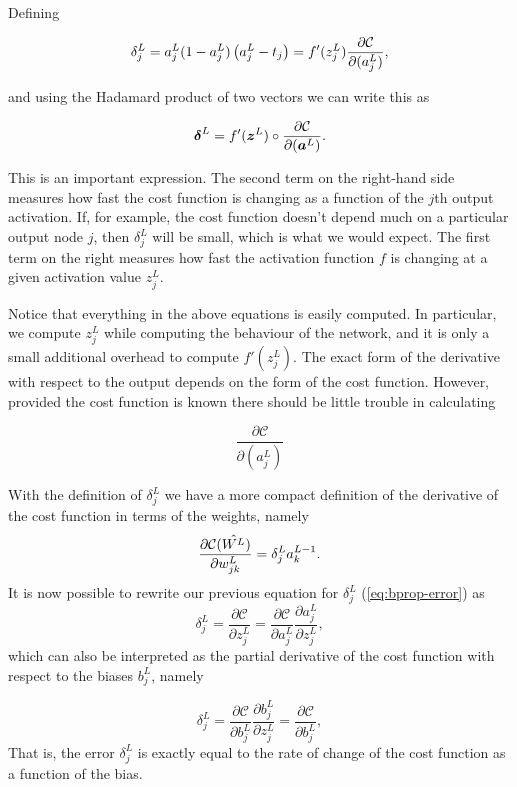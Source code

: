 \noindent Defining

$$\delta_j^L = a_j^L(1-a_j^L)\left(a_j^L - t_j\right) = f'(z_j^L)\frac{\partial {\cal C}}{\partial (a_j^L)},$$

and using the Hadamard product of two vectors we can write this as

\begin{equation}\label{eq:bprop-error}
	{\boldsymbol{\delta}}^L = f'({\boldsymbol{z}}^L)\circ\frac{\partial \mathcal{C}}{\partial ({\boldsymbol{a}}^L)}.
\end{equation}

\noindent This is an important expression. The second term on the right-hand side
measures how fast the cost function is changing as a function of the $j$th
output activation.  If, for example, the cost function doesn't depend
much on a particular output node $j$, then $\delta_j^L$ will be small,
which is what we would expect. The first term on the right measures
how fast the activation function $f$ is changing at a given activation
value $z_j^L$.

\noindent Notice that everything in the above equations is easily computed.  In
particular, we compute $z_j^L$ while computing the behaviour of the
network, and it is only a small additional overhead to compute
$f'(z^L_j)$.  The exact form of the derivative with respect to the
output depends on the form of the cost function.
However, provided the cost function is known there should be little
trouble in calculating

$$\frac{\partial \mathcal{C}}{\partial (a_j^L)}$$

\noindent With the definition of $\delta_j^L$ we have a more compact definition of the derivative of the cost function in terms of the weights, namely
\begin{equation}\label{eq:cost-derivative-compact}
	\frac{\partial{\cal C}(\hat{W^L})}{\partial w_{jk}^L}  =  \delta_j^La_k^{L-1}.
\end{equation}
It is now possible to rewrite our previous equation for $\delta_j^L$ (\ref{eq:bprop-error}) as
\begin{equation}
	\delta_j^L =\frac{\partial \mathcal{C}}{\partial z_j^L}= \frac{\partial \mathcal{C}}{\partial a_j^L}\frac{\partial a_j^L}{\partial z_j^L},
\end{equation}
which can also be interpreted as the partial derivative of the cost function with respect to the biases $b_j^L$, namely

$$\delta_j^L = \frac{\partial\mathcal{C}}{\partial b_j^L}\frac{\partial b_j^L}{\partial z_j^L}=\frac{\partial\mathcal{C}}{\partial b_j^L},$$
That is, the error $\delta_j^L$ is exactly equal to the rate of change of the cost function as a function of the bias.

